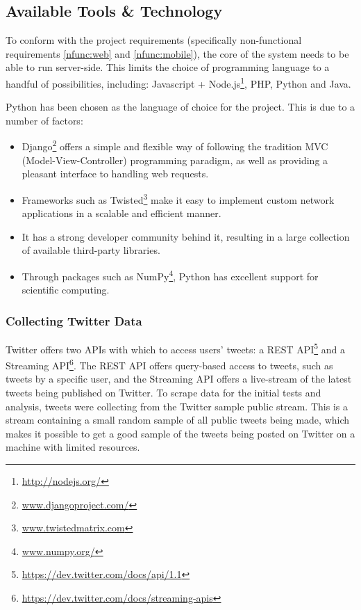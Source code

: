 \documentclass[12pt,a4paper]{article}
\begin{document}
\subsection{Available Tools \& Technology}

To conform with the project requirements (specifically non-functional requirements \ref{nfunc:web} and \ref{nfunc:mobile}), the core of the system needs to be able to run server-side. This limits the choice of programming language to a handful of possibilities, including: Javascript + Node.js\footnote{\url{http://nodejs.org/}}, PHP, Python and Java.

Python has been chosen as the language of choice for the project. This is due to a number of factors:
\begin{itemize}
    \item Django\footnote{\url{www.djangoproject.com/}} offers a simple and flexible way of following the tradition MVC (Model-View-Controller) programming paradigm, as well as providing a pleasant interface to handling web requests.
    \item Frameworks such as Twisted\footnote{\url{www.twistedmatrix.com}} make it easy to implement custom network applications in a scalable and efficient manner.
    \item It has a strong developer community behind it, resulting in a large collection of available third-party libraries.
    \item Through packages such as NumPy\footnote{\url{www.numpy.org/}}, Python has excellent support for scientific computing.
\end{itemize}
        
\subsubsection{Collecting Twitter Data}
Twitter offers two APIs with which to access users' tweets: a REST API\footnote{\url{https://dev.twitter.com/docs/api/1.1}} and a Streaming API\footnote{\url{https://dev.twitter.com/docs/streaming-apis}}. The REST API offers query-based access to tweets, such as tweets by a specific user, and the Streaming API offers a live-stream of the latest tweets being published on Twitter. To scrape data for the initial tests and analysis, tweets were collecting from the Twitter sample public stream. This is a stream containing a small random sample of all public tweets being made, which makes it possible to get a good sample of the tweets being posted on Twitter on a machine with limited resources.
\end{document}
